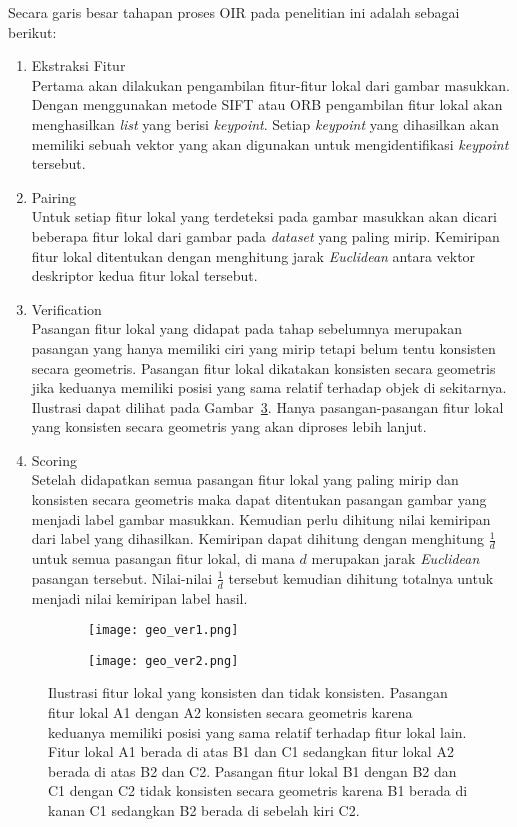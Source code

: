 Secara garis besar tahapan proses OIR pada penelitian ini adalah sebagai berikut:
\begin{enumerate}
	\item Ekstraksi Fitur \\
	Pertama akan dilakukan pengambilan fitur-fitur lokal dari gambar masukkan. Dengan menggunakan metode SIFT atau ORB pengambilan fitur lokal akan menghasilkan \textit{list} yang  berisi \textit{keypoint}. Setiap \textit{keypoint} yang dihasilkan akan memiliki sebuah vektor yang akan digunakan untuk mengidentifikasi \textit{keypoint} tersebut.
	\item Pairing \\
	Untuk setiap fitur lokal yang terdeteksi pada gambar masukkan akan dicari beberapa fitur lokal dari gambar pada \textit{dataset} yang paling mirip. Kemiripan fitur lokal ditentukan dengan menghitung jarak \textit{Euclidean} antara vektor deskriptor kedua fitur lokal tersebut.
	\item Verification \\
	Pasangan fitur lokal yang didapat pada tahap sebelumnya merupakan pasangan yang hanya memiliki ciri yang mirip tetapi belum tentu konsisten secara geometris. Pasangan fitur lokal dikatakan konsisten secara geometris jika keduanya memiliki posisi yang sama relatif terhadap objek di sekitarnya. Ilustrasi dapat dilihat pada Gambar~\ref{fig:geo_ver}. Hanya pasangan-pasangan fitur lokal yang konsisten secara geometris yang akan diproses lebih lanjut.
	\item Scoring \\
	Setelah didapatkan semua pasangan fitur lokal yang paling mirip dan konsisten secara geometris maka dapat ditentukan pasangan gambar yang menjadi label gambar masukkan. Kemudian perlu dihitung nilai kemiripan dari label yang dihasilkan. Kemiripan dapat dihitung dengan menghitung $\frac{1}{d}$ untuk semua pasangan fitur lokal, di mana $d$ merupakan jarak \textit{Euclidean} pasangan tersebut. Nilai-nilai $\frac{1}{d}$ tersebut kemudian dihitung totalnya untuk menjadi nilai kemiripan label hasil.
	
\end{enumerate}
\begin{figure}[H]
	\begin{subfigure}[b]{.5\textwidth}
		\centering
		\texttt{[image: geo\_ver1.png]}
		\caption{}
		\label{subfig:geo_ver1}
	\end{subfigure}%
	\begin{subfigure}[b]{.5\textwidth}
		\centering
		\texttt{[image: geo\_ver2.png]}
		\caption{}
		\label{subfig:geo_ver2}
	\end{subfigure}
	\caption{Ilustrasi fitur lokal yang konsisten dan tidak konsisten. Pasangan fitur lokal A1 dengan A2 konsisten secara geometris karena keduanya memiliki posisi yang sama relatif terhadap fitur lokal lain. Fitur lokal A1 berada di atas B1 dan C1 sedangkan fitur lokal A2 berada di atas B2 dan C2. Pasangan fitur lokal B1 dengan B2 dan C1 dengan C2 tidak konsisten secara geometris karena B1 berada di kanan C1 sedangkan B2 berada di sebelah kiri C2.}
	\label{fig:geo_ver}
\end{figure}

